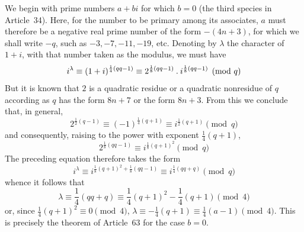 We begin with prime numbers $a+bi$ for which $b=0$ (the third species in Article~34). Here, for the number to be primary among its associates, $a$ must therefore be a negative real prime number of the form $-(4n+3)$, for which we shall write $-q$, such as $-3,-7,-11,-19$, etc. Denoting by $\lambda$ the character of $1+i$, with that number taken as the modulus, we must have
\[
i^\lambda\equiv(1+i)^{\frac14(qq-1)}\equiv2^{\frac18(qq-1)}\mathbin{.} i^{\frac18(qq-1)}\pmod q
\]
But it is known that $2$ is a quadratic residue or a quadratic nonresidue of $q$ according as $q$ has the form $8n+7$ or the form $8n+3$. From this we conclude that, in general,
\[
2^{\frac12(q-1)}\equiv(-1)^{\frac14(q+1)}\equiv i^{\frac12(q+1)}\pmod q
\]
and consequently, raising to the power with exponent $\frac14(q+1)$,
\[
2^{\frac18(qq-1)}\equiv i^{\frac18(q+1)^2}\pmod q
\]
The preceding equation therefore takes the form
\[
i^\lambda\equiv i^{\frac18(q+1)^2+\frac18(qq-1)}\equiv i^{\frac14(qq+q)}\pmod q
\]
whence it follows that
\[
\lambda\equiv\frac14(qq+q)\equiv\frac14(q+1)^2-\frac14(q+1)\pmod4
\]
or, since $\frac14(q+1)^2\equiv0\pmod4$, $\lambda\equiv-\frac14(q+1)\equiv\frac14(a-1)\pmod4$. This is precisely the theorem of Article~63 for the case $b=0$.

%

